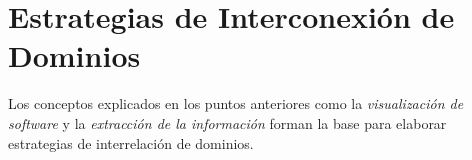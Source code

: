 




 




\pagebreak
\section{Estrategias de Interconexión de \\Dominios}

Los conceptos explicados en los puntos anteriores como la \textit{visualización de software} y la \textit{extracción de la información} forman la base para elaborar estrategias de interrelación de dominios.


